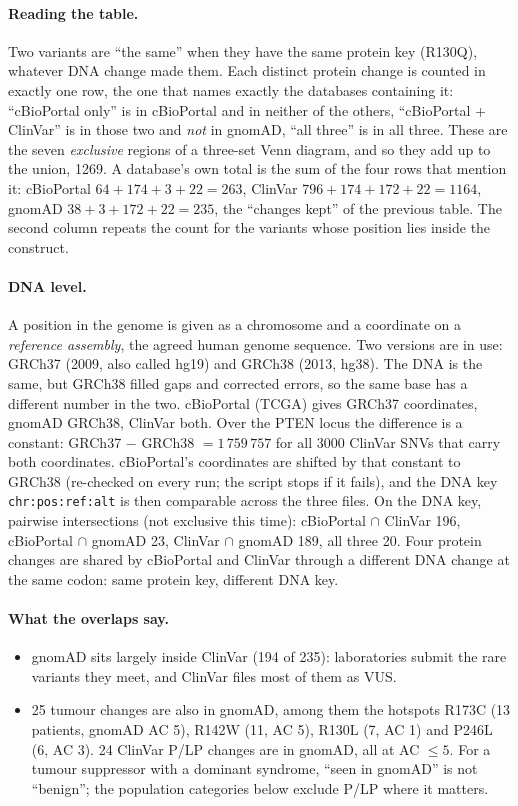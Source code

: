 \documentclass[11pt,a4paper]{article}
\begin{document}
\paragraph{Reading the table.} Two variants are ``the same'' when they have
the same protein key (R130Q), whatever DNA change made them. Each distinct
protein change is counted in exactly one row, the one that names exactly the
databases containing it: ``cBioPortal only'' is in cBioPortal and in neither
of the others, ``cBioPortal + ClinVar'' is in those two and \emph{not} in
gnomAD, ``all three'' is in all three. These are the seven \emph{exclusive}
regions of a three-set Venn diagram, and so they add up to the union, 1269.
A database's own total is the sum of the four rows that mention it:
cBioPortal $64+174+3+22 = 263$, ClinVar $796+174+172+22 = 1164$, gnomAD
$38+3+172+22 = 235$, the ``changes kept'' of the previous table. The second
column repeats the count for the variants whose position lies inside the
construct.

\paragraph{DNA level.} A position in the genome is given as a chromosome
and a coordinate on a \emph{reference assembly}, the agreed human genome
sequence. Two versions are in use: GRCh37 (2009, also called hg19) and GRCh38
(2013, hg38). The DNA is the same, but GRCh38 filled gaps and corrected
errors, so the same base has a different number in the two. cBioPortal (TCGA)
gives GRCh37 coordinates, gnomAD GRCh38, ClinVar both. Over the PTEN locus the
difference is a constant: GRCh37 $-$ GRCh38 $= 1\,759\,757$ for all 3000
ClinVar SNVs that carry both coordinates. cBioPortal's coordinates are
shifted by that constant to GRCh38 (re-checked on every run; the script stops
if it fails), and the DNA key \texttt{chr:pos:ref:alt} is then comparable
across the three files. On the DNA key, pairwise intersections (not exclusive
this time): cBioPortal $\cap$ ClinVar 196, cBioPortal $\cap$ gnomAD 23,
ClinVar $\cap$ gnomAD 189, all three 20. Four protein changes are shared by
cBioPortal and ClinVar through a different DNA change at the same codon: same
protein key, different DNA key.

\paragraph{What the overlaps say.}
\begin{itemize}
\item gnomAD sits largely inside ClinVar (194 of 235): laboratories submit the
  rare variants they meet, and ClinVar files most of them as VUS.
\item 25 tumour changes are also in gnomAD, among them the hotspots R173C (13
  patients, gnomAD AC 5), R142W (11, AC 5), R130L (7, AC 1) and P246L (6, AC
  3). 24 ClinVar P/LP changes are in gnomAD, all at AC $\le 5$. For a
  tumour suppressor with a dominant syndrome, ``seen in gnomAD'' is not
  ``benign''; the population categories below exclude P/LP where it matters.
\end{itemize}
\end{document}
